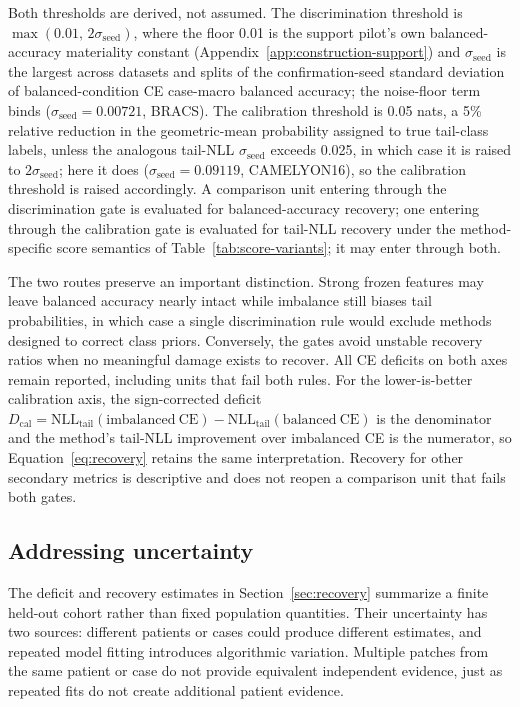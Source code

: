 \documentclass[11pt]{article}
\begin{document}
Both thresholds are derived, not assumed. The discrimination threshold is $\max(0.01,\,2\sigma_{\mathrm{seed}})$, where the floor \num{0.01} is the support pilot's own balanced-accuracy materiality constant (Appendix~\ref{app:construction-support}) and $\sigma_{\mathrm{seed}}$ is the largest across datasets and splits of the confirmation-seed standard deviation of balanced-condition CE case-macro balanced accuracy; the noise-floor term binds ($\sigma_{\mathrm{seed}}=0.00721$, BRACS). The calibration threshold is \num{0.05} nats, a 5\% relative reduction in the geometric-mean probability assigned to true tail-class labels, unless the analogous tail-NLL $\sigma_{\mathrm{seed}}$ exceeds \num{0.025}, in which case it is raised to $2\sigma_{\mathrm{seed}}$; here it does ($\sigma_{\mathrm{seed}}=0.09119$, CAMELYON16), so the calibration threshold is raised accordingly. A comparison unit entering through the discrimination gate is evaluated for balanced-accuracy recovery; one entering through the calibration gate is evaluated for tail-NLL recovery under the method-specific score semantics of Table~\ref{tab:score-variants}; it may enter through both.

The two routes preserve an important distinction. Strong frozen features may leave balanced accuracy nearly intact while imbalance still biases tail probabilities, in which case a single discrimination rule would exclude methods designed to correct class priors. Conversely, the gates avoid unstable recovery ratios when no meaningful damage exists to recover. All CE deficits on both axes remain reported, including units that fail both rules. For the lower-is-better calibration axis, the sign-corrected deficit $D_{\mathrm{cal}}=\mathrm{NLL}_{\mathrm{tail}}(\mathrm{imbalanced\ CE})-\mathrm{NLL}_{\mathrm{tail}}(\mathrm{balanced\ CE})$ is the denominator and the method's tail-NLL improvement over imbalanced CE is the numerator, so Equation~\eqref{eq:recovery} retains the same interpretation. Recovery for other secondary metrics is descriptive and does not reopen a comparison unit that fails both gates.

\subsection{Addressing uncertainty}
The deficit and recovery estimates in Section~\ref{sec:recovery} summarize a finite held-out cohort rather than fixed population quantities. Their uncertainty has two sources: different patients or cases could produce different estimates, and repeated model fitting introduces algorithmic variation. Multiple patches from the same patient or case do not provide equivalent independent evidence, just as repeated fits do not create additional patient evidence.
\end{document}
